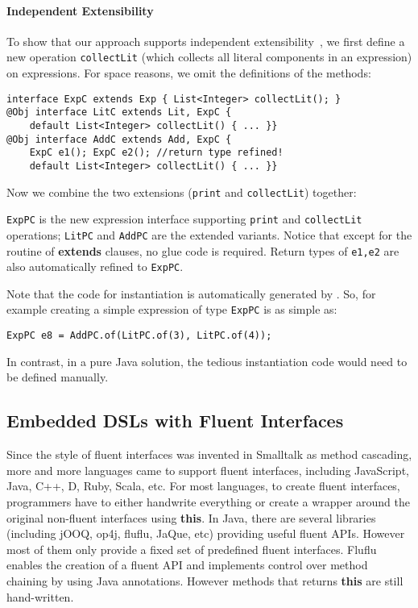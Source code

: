 \paragraph{Independent Extensibility}
To show that our approach supports independent extensibility~\cite{zenger05independentlyextensible}, we first define a
new operation \texttt{collectLit} (which collects all
literal components in an expression) on expressions. For space reasons, 
we omit the definitions of the methods: 

\begin{lstlisting}[]
interface ExpC extends Exp { List<Integer> collectLit(); }
@Obj interface LitC extends Lit, ExpC {
    default List<Integer> collectLit() { ... }}
@Obj interface AddC extends Add, ExpC {
    ExpC e1(); ExpC e2(); //return type refined!
    default List<Integer> collectLit() { ... }}
\end{lstlisting}

\noindent Now we combine the two extensions (\texttt{print} and
\texttt{collectLit}) together:



\noindent \texttt{ExpPC} is the new expression interface supporting
\texttt{print} and \texttt{collectLit} operations; \texttt{LitPC} and
\texttt{AddPC} are the extended variants. Notice that except for the routine of
\textbf{extends} clauses, no glue code is required. Return types of
\texttt{e1,e2} are also automatically refined to \texttt{ExpPC}.

Note that the code for instantiation is automatically generated by \mixin. 
So, for example creating a simple expression of type \texttt{ExpPC} is 
as simple as:
\begin{lstlisting}
ExpPC e8 = AddPC.of(LitPC.of(3), LitPC.of(4));
\end{lstlisting}
\noindent In contrast, in a pure Java solution, the tedious instantiation code would need 
to be defined manually. 

\subsection{Embedded DSLs with Fluent Interfaces}\label{sec:dsls}
Since the style of fluent interfaces was invented in Smalltalk as method
cascading, more and more languages came to support fluent interfaces, including
JavaScript, Java, C++, D, Ruby, Scala, etc. For most languages, to create fluent
interfaces, programmers have to either handwrite everything or create a wrapper
around the original non-fluent interfaces using \textbf{this}. In Java, there
are several libraries (including jOOQ, op4j, fluflu, JaQue, etc) providing useful
fluent APIs. However most of them only provide a fixed set of predefined fluent
interfaces. Fluflu enables the creation of a fluent API and implements control
over method chaining by using Java annotations. However methods that returns
\textbf{this} are still hand-written.


